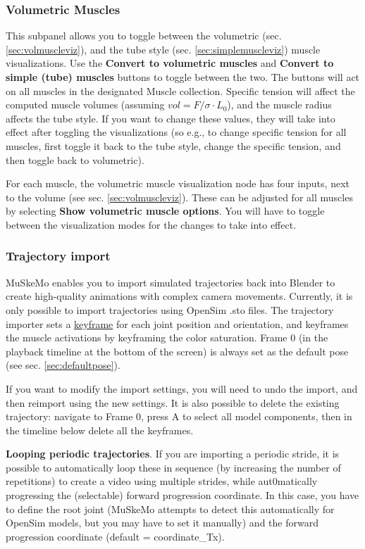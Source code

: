 \documentclass{article}
\begin{document}
\subsubsection{Volumetric Muscles}
\label{sec:visualizationpanelvolmusc}
This subpanel allows you to toggle between the volumetric (sec. \ref{sec:volmuscleviz}), and the tube style (sec. \ref{sec:simplemuscleviz}) muscle visualizations. Use the \textbf{Convert to volumetric muscles} and \textbf{Convert to simple (tube) muscles} buttons to toggle between the two. The buttons will act on all muscles in the designated Muscle collection. Specific tension will affect the computed muscle volumes (assuming $vol = F/\sigma \cdot L_{0}$), and the muscle radius affects the tube style. If you want to change these values, they will take into effect after toggling the visualizations (so e.g., to change specific tension for all muscles, first toggle it back to the tube style, change the specific tension, and then toggle back to volumetric).

For each muscle, the volumetric muscle visualization node has four inputs, next to the volume (see sec. \ref{sec:volmuscleviz}). These can be adjusted for all muscles by selecting \textbf{Show volumetric muscle options}. You will have to toggle between the visualization modes for the changes to take into effect.

\subsubsection{Trajectory import}
\label{sec:trajectoryimport}
MuSkeMo enables you to import simulated trajectories back into Blender to create high-quality animations with complex camera movements. Currently, it is only possible to import trajectories using OpenSim .sto files. The trajectory importer sets a \href{https://docs.blender.org/manual/en/latest/animation/keyframes/index.html}{keyframe} for each joint position and orientation, and keyframes the muscle activations by keyframing the color saturation. Frame 0 (in the playback timeline at the bottom of the screen) is always set as the default pose (see sec. \ref{sec:defaultpose}).

If you want to modify the import settings, you will need to undo the import, and then reimport using the new settings. It is also possible to delete the existing trajectory: navigate to Frame 0, press A to select all model components, then in the timeline below delete all the keyframes.

\textbf{Looping periodic trajectories}. If you are importing a periodic stride, it is possible to automatically loop these in sequence (by increasing the number of repetitions) to create a video using multiple strides, while aut0matically progressing the (selectable) forward progression coordinate. In this case, you have to define the root joint (MuSkeMo attempts to detect this automatically for OpenSim models, but you may have to set it manually) and the forward progression coordinate (default = coordinate\_Tx).
\end{document}
